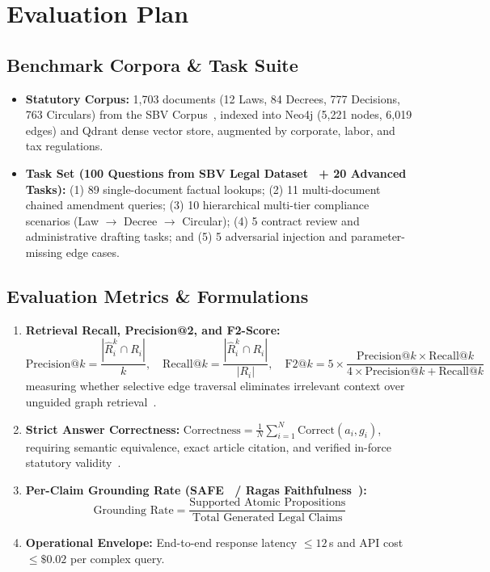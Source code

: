 \documentclass[10pt,a4paper]{article}
\begin{document}
\section{Evaluation Plan}

\subsection{Benchmark Corpora \& Task Suite}
\begin{itemize}[leftmargin=11pt]
  \item \textbf{Statutory Corpus:} 1,703 documents (12 Laws, 84 Decrees, 777 Decisions, 763 Circulars) from the SBV Corpus~\cite{phan2026sbvlawgraph}, indexed into Neo4j (5,221 nodes, 6,019 edges) and Qdrant dense vector store, augmented by corporate, labor, and tax regulations.
  \item \textbf{Task Set (100 Questions from SBV Legal Dataset~\cite{phan2026sbvlawgraph} + 20 Advanced Tasks):}
    (1) 89 single-document factual lookups;
    (2) 11 multi-document chained amendment queries;
    (3) 10 hierarchical multi-tier compliance scenarios (Law $\rightarrow$ Decree $\rightarrow$ Circular);
    (4) 5 contract review and administrative drafting tasks; and
    (5) 5 adversarial injection and parameter-missing edge cases.
\end{itemize}

\subsection{Evaluation Metrics \& Formulations}
\begin{enumerate}
  \item \textbf{Retrieval Recall, Precision@2, and F2-Score:}
    $$\text{Precision@}k = \frac{|\hat{R}_i^k \cap R_i|}{k}, \quad \text{Recall@}k = \frac{|\hat{R}_i^k \cap R_i|}{|R_i|}, \quad \text{F2@}k = 5 \times \frac{\text{Precision@}k \times \text{Recall@}k}{4 \times \text{Precision@}k + \text{Recall@}k}$$
    measuring whether selective edge traversal eliminates irrelevant context over unguided graph retrieval~\cite{phan2026sbvlawgraph}.
  \item \textbf{Strict Answer Correctness:} $\text{Correctness} = \frac{1}{N} \sum_{i=1}^N \text{Correct}(a_i, g_i)$, requiring semantic equivalence, exact article citation, and verified in-force statutory validity~\cite{zhou2026lexagent}.
  \item \textbf{Per-Claim Grounding Rate (SAFE~\cite{wei2024safe} / Ragas Faithfulness~\cite{es2024ragas}):}
    $$\text{Grounding Rate} = \frac{\text{Supported Atomic Propositions}}{\text{Total Generated Legal Claims}}$$
  \item \textbf{Operational Envelope:} End-to-end response latency $\le 12$\,s and API cost $\le \$0.02$ per complex query.
\end{enumerate}
\end{document}
